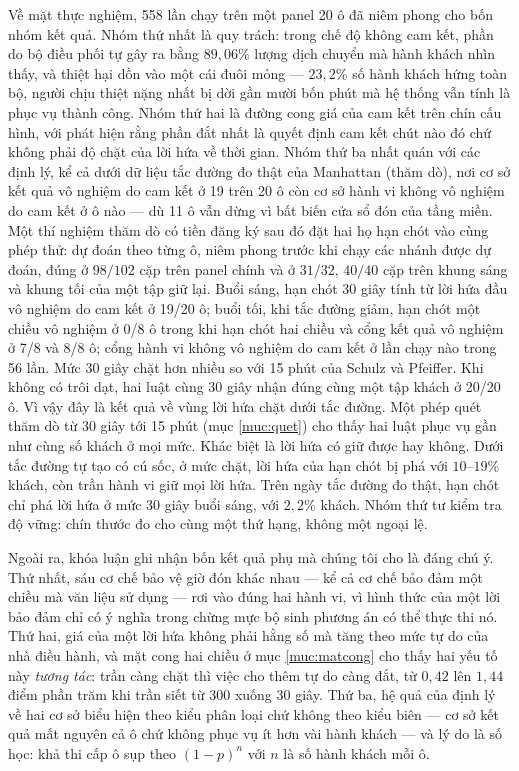 Về mặt thực nghiệm, 558 lần chạy trên một panel 20 ô đã niêm phong cho bốn nhóm kết quả. Nhóm
thứ nhất là quy trách: trong chế độ không cam kết, phần do bộ điều phối tự gây ra bằng
$89{,}06\%$ lượng dịch chuyển mà hành khách nhìn thấy, và thiệt hại dồn vào một cái đuôi mỏng --- $23{,}2\%$ số
hành khách hứng toàn bộ, người chịu thiệt nặng nhất bị dời gần mười bốn phút mà hệ thống vẫn
tính là phục vụ thành công. Nhóm thứ hai là đường cong giá của cam kết trên chín cấu hình, với
phát hiện rằng phần đắt nhất là quyết định cam kết chút nào đó chứ không phải độ chặt của lời
hứa về thời gian. Nhóm thứ ba nhất quán với các định lý, kể cả dưới dữ liệu tắc đường đo thật của
Manhattan (thăm dò), nơi cơ sở kết quả vô nghiệm do cam kết ở 19 trên 20 ô còn cơ sở hành vi không
vô nghiệm do cam kết ở ô nào --- dù 11 ô vẫn dừng vì bất biến cửa sổ đón của tầng miền. Một thí
nghiệm thăm dò có tiền đăng ký sau đó đặt hai họ hạn chót vào cùng phép thử: dự đoán theo từng ô,
niêm phong trước khi chạy các nhánh được dự đoán, đúng ở $98/102$ cặp trên panel chính và ở $31/32$, $40/40$ cặp trên khung
sáng và khung tối của một tập giữ lại. Buổi sáng, hạn chót 30 giây tính từ lời hứa đầu vô nghiệm do
cam kết ở 19/20 ô; buổi tối, khi tắc đường giảm, hạn chót một chiều vô nghiệm ở 0/8 ô trong khi hạn
chót hai chiều và cổng kết quả vô nghiệm ở 7/8 và 8/8 ô; cổng hành vi không vô nghiệm do cam kết ở
lần chạy nào trong 56 lần. Mức 30 giây chặt hơn nhiều so với 15 phút của Schulz và Pfeiffer. Khi không
có trôi dạt, hai luật cùng 30 giây nhận đúng cùng một tập khách ở 20/20 ô. Vì vậy đây là kết quả về
vùng lời hứa chặt dưới tắc đường. Một phép quét thăm dò từ 30 giây tới 15 phút (mục \ref{muc:quet})
cho thấy hai luật phục vụ gần như cùng số khách ở mọi mức. Khác biệt là lời hứa có giữ được hay
không. Dưới tắc đường tự tạo có cú sốc, ở mức chặt, lời hứa của hạn chót bị phá với $10$--$19\%$ khách,
còn trần hành vi giữ mọi lời hứa. Trên ngày tắc đường đo thật, hạn chót chỉ phá lời hứa ở mức 30 giây
buổi sáng, với $2{,}2\%$ khách. Nhóm thứ tư kiểm tra độ vững: chín thước đo cho cùng một thứ hạng, không
một ngoại lệ.

Ngoài ra, khóa luận ghi nhận bốn kết quả phụ mà chúng tôi cho là đáng chú ý. Thứ nhất, sáu cơ
chế bảo vệ giờ đón khác nhau --- kể cả cơ chế bảo đảm một chiều mà văn liệu sử dụng --- rơi vào
đúng hai hành vi, vì hình thức của một lời bảo đảm chỉ có ý nghĩa trong chừng mực bộ sinh
phương án có thể thực thi nó. Thứ hai, giá của một lời hứa không phải hằng số mà tăng theo mức
tự do của nhà điều hành, và mặt cong hai chiều ở mục \ref{muc:matcong} cho thấy hai yếu tố này
\emph{tương tác}: trần càng chặt thì việc cho thêm tự do càng đắt, từ $0{,}42$ lên $1{,}44$
điểm phần trăm khi trần siết từ 300 xuống 30 giây. Thứ ba, hệ quả của định lý về hai cơ sở
biểu hiện theo kiểu phân loại chứ không theo kiểu biên --- cơ sở kết quả mất nguyên cả ô chứ
không phục vụ ít hơn vài hành khách --- và lý do là số học: khả thi cấp ô sụp theo $(1-p)^{n}$
với $n$ là số hành khách mỗi ô.

